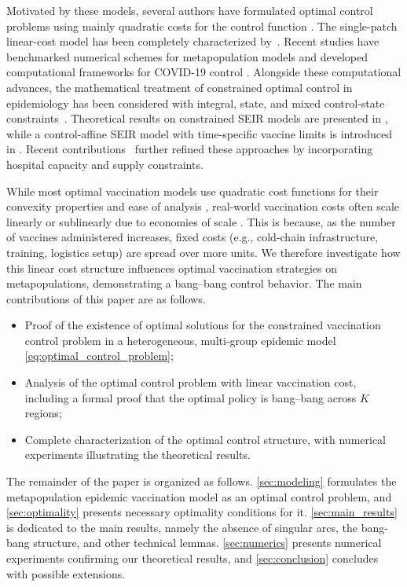 \documentclass[letterpaper, 10 pt, conference]{ieeeconf}
\begin{document}
Motivated by these models, several authors have formulated optimal control problems using mainly quadratic costs for the control function \cite{ogren2002vaccination, asano2008optimal, rowthorn2009optimal}.
The single-patch linear-cost model has been completely characterized by~\cite{behncke2000optimal}.
Recent studies have benchmarked numerical schemes for metapopulation models \cite{salii2022benchmarking} and developed computational frameworks for COVID-19 control \cite{lemaitre2022optimal, nonato_robot_2022}.
Alongside these computational advances, the mathematical treatment of constrained optimal control in epidemiology has been considered with integral, state, and mixed control-state constraints~\cite{hansen2011optimal}.
Theoretical results on constrained SEIR models are presented in \cite{biswas2014seir}, while a control-affine SEIR model with time-specific vaccine limits is introduced in \cite{ de2015optimal}.
Recent contributions~\cite{avram2022optimal, trabelsi2023constrained} further refined these approaches by incorporating hospital capacity and supply constraints.

While most optimal vaccination models use quadratic cost functions for their convexity properties and ease of analysis \cite{gaff2009optimal,NeilanLenhart2010}, real-world vaccination costs often scale linearly or sublinearly due to economies of scale \cite{gandhi2014updating, portnoy2020producing}. 
This is because, as the number of vaccines administered increases, fixed costs (e.g., cold-chain infrastructure, training, logistics setup) are spread over more units.
We therefore investigate how this linear cost structure influences optimal vaccination strategies on metapopulations, demonstrating a bang--bang control behavior.
The main contributions of this paper are as follows.
\begin{itemize} 
    \item Proof of the existence of optimal solutions for the constrained vaccination control problem in a heterogeneous, multi-group epidemic model \eqref{eq:optimal_control_problem}; 
    \item Analysis of the optimal control problem with linear vaccination cost, including a formal proof that the optimal policy is bang--bang across $K$ regions;
    \item Complete characterization of the optimal control structure, with numerical experiments illustrating the theoretical results. 
\end{itemize}

The remainder of the paper is organized as follows. 
\autoref{sec:modeling} formulates the metapopulation epidemic vaccination model as an optimal control problem, and \autoref{sec:optimality} presents necessary optimality conditions for it.
\autoref{sec:main_results} is dedicated to the main results, namely the absence of singular arcs, the bang-bang structure, and other technical lemmas. 
\autoref{sec:numerics} presents numerical experiments confirming our theoretical results, and \autoref{sec:conclusion} concludes with possible extensions.
\end{document}
